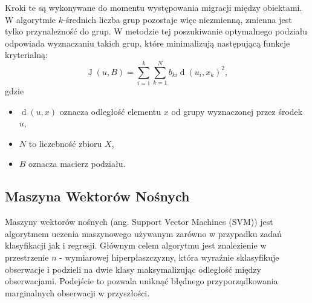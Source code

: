 \documentclass[12pt,a4paper]{report}
\newcommand{\J}[2]{\operatorname{J}\left({#1}, {#2} \right)}
\newcommand{\distance}[2]{\operatorname{d}\left({#1}, {#2} \right)}
\begin{document}
Kroki te są wykonywane do momentu występowania migracji między obiektami.
W algorytmie $k$-średnich liczba grup pozostaje więc niezmienną, zmienna jest tylko przynależność do grup.
W metodzie tej poszukiwanie optymalnego podziału odpowiada wyznaczaniu takich grup, które minimalizują następującą funkcje kryterialną:
$$
\J{u}{B} = \sum_{i=1}^k \sum_{k=1}^N b_{ki}\distance{u_i}{x_k}^2,
$$
gdzie 
\begin{itemize}
\item $\distance{u}{x}$ oznacza odległość elementu $x$ od grupy wyznaczonej przez środek $u$,
\item $N$ to liczebność zbioru $X$,
\item $B$ oznacza macierz podziału.
\end{itemize}
 

\subsection{Maszyna Wektorów Nośnych}
Maszyny wektorów nośnych (ang. Support Vector Machines (SVM)) jest algorytmem uczenia maszynowego używanym zarówno w przypadku zadań klasyfikacji jak i regresji. Głównym celem algorytmu jest znalezienie w przestrzenie $n$ - wymiarowej hiperpłaszczyzny, która wyraźnie sklasyfikuje obserwacje i podzieli na dwie klasy maksymalizując odległość między obserwacjami. Podejście to pozwala uniknąć błędnego przyporządkowania marginalnych obserwacji w przyszłości.
\end{document}
